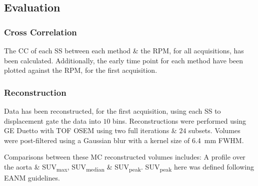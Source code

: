     \subsection{Evaluation} \label{sec:evaluation}
        \subsubsection{Cross Correlation} \label{sec:cross_correlation}
            The \gls{CC} of each \gls{SS} between each method \& the \gls{RPM}, for all acquisitions, has been calculated. Additionally, the early time point  for each method have been plotted against the \gls{RPM}, for the first acquisition.
        
        \subsubsection{Reconstruction} \label{sec:reconstruction}
            Data has been reconstructed, for the first acquisition, using each \gls{SS} to displacement gate the data into $10$ bins. Reconstructions were performed using \gls{GE} Duetto with \gls{TOF} \gls{OSEM} using two full iterations \& $24$ subsets.%
            Volumes were post-filtered using a Gaussian blur with a kernel size of \SI{6.4}{\milli\metre} \gls{FWHM}.
            
            Comparisons between these \gls{MC} reconstructed volumes includes: A profile over the aorta \& \gls{SUV}\textsubscript{max}, \gls{SUV}\textsubscript{median} \& \gls{SUV}\textsubscript{peak}. \gls{SUV}\textsubscript{peak} here was defined following \gls{EANM} guidelines.%
        
